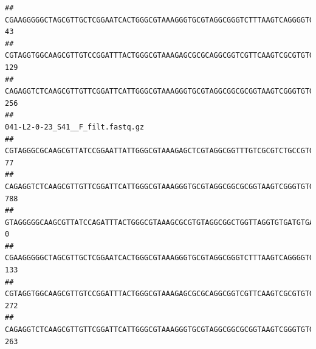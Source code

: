 \documentclass[]{article}
\begin{document}
\begin{verbatim}
## CGAAGGGGGCTAGCGTTGCTCGGAATCACTGGGCGTAAAGGGTGCGTAGGCGGGTCTTTAAGTCAGGGGTGAAATCCTGGAGCTCAACTCCAGAACTGCCTTTGATACTGAAGATCTTGAGTTCGGGAGAGGTGAGTGGAACTGCGAGTGTAGAGGTGAAATTCGTAGATATTCGCAAGAACACCAGTGGCGAAGGCGGCTCACTGGCCCGATACTGACGCTGAGGCACGAAAGCGTGGGGAGCAAACA                                  43
## CGTAGGTGGCAAGCGTTGTCCGGATTTACTGGGCGTAAAGAGCGCGCAGGCGGTCGTTCAAGTCGCGTGTGAAAGCCCCCGGCTCAACTGGGGAGGGTCACGCGATACTGATCGACTCGAAGGCAGGAGAGGGTAGTGGAATTCCCGGTGTAGTGGTGAAATGCGTAGATATCGGGAGGAACACCAGTGGCGAAGGCGACTACCTGGCCTGTTCTTGACGCTGAGGCGCGAAAGCTAGGGGAGCAAACG                                 129
## CAGAGGTCTCAAGCGTTGTTCGGATTCATTGGGCGTAAAGGGTGCGTAGGCGGCGCGGTAAGTCGGGTGTGAAATCTCGGGGCTTAACTCCGAAACTGCATTCGATACTGCCGTGCTTGAGGACTGGAGAGGAGACTGGAATTTACGGTGTAGCGGTGAAATGCGTAGATATCGTAAGGAAGACCAGTGGCGAAGGCGGGTCTCTGGACAGTTCCTGACGCTGAGGCACGAAGGCCAGGGGAGCAAACG                                 256
##                                                                                                                                                                                                                                                           041-L2-0-23_S41__F_filt.fastq.gz
## CGTAGGGCGCAAGCGTTATCCGGAATTATTGGGCGTAAAGAGCTCGTAGGCGGTTTGTCGCGTCTGCCGTGAAAGTCCGGGGCTCAACTCCGGATCTGCGGTGGGTACGGGCAGACTAGAGTGATGTAGGGGAGACTGGAATTCCTGGTGTAGCGGTGAAATGCGCAGATATCAGGAGGAACACCGATGGCGAAGGCAGGTCTCTGGGCATTAACTGACGCTGAGGAGCGAAAGCATGGGGAGCGAACA                               77
## CAGAGGTCTCAAGCGTTGTTCGGATTCATTGGGCGTAAAGGGTGCGTAGGCGGCGCGGTAAGTCGGGTGTGAAATCTCGGAGCTTAACTCCGAAACTGCATTCGATACTGCCGTGCTTGAGGACTGGAGAGGAGACTGGAATTTACGGTGTAGCGGTGAAATGCGTAGATATCGTAAGGAAGACCAGTGGCGAAGGCGGGTCTCTGGACAGTTCCTGACGCTGAGGCACGAAGGCCAGGGGAGCAAACG                              788
## GTAGGGGGCAAGCGTTATCCAGATTTACTGGGCGTAAAGCGCGTGTAGGCGGCTGGTTAGGTGTGATGTGAAATCTTCCGGCTCAACCGGAAAACTGCATTGCAAACCGGCCTGGCTAGAGTGCAGGAGAGGGAAGCGGAATTCCAGGTGTAGCGGTGAAATGCGTAGATATCTGGAGGAACACCAGTGGCGAAGGCGGCTTCCTGGCCTGCAACTGACGCTGAGACGCGAAAGCGTGGGGAGCGAAC                                 0
## CGAAGGGGGCTAGCGTTGCTCGGAATCACTGGGCGTAAAGGGTGCGTAGGCGGGTCTTTAAGTCAGGGGTGAAATCCTGGAGCTCAACTCCAGAACTGCCTTTGATACTGAAGATCTTGAGTTCGGGAGAGGTGAGTGGAACTGCGAGTGTAGAGGTGAAATTCGTAGATATTCGCAAGAACACCAGTGGCGAAGGCGGCTCACTGGCCCGATACTGACGCTGAGGCACGAAAGCGTGGGGAGCAAACA                              133
## CGTAGGTGGCAAGCGTTGTCCGGATTTACTGGGCGTAAAGAGCGCGCAGGCGGTCGTTCAAGTCGCGTGTGAAAGCCCCCGGCTCAACTGGGGAGGGTCACGCGATACTGATCGACTCGAAGGCAGGAGAGGGTAGTGGAATTCCCGGTGTAGTGGTGAAATGCGTAGATATCGGGAGGAACACCAGTGGCGAAGGCGACTACCTGGCCTGTTCTTGACGCTGAGGCGCGAAAGCTAGGGGAGCAAACG                              272
## CAGAGGTCTCAAGCGTTGTTCGGATTCATTGGGCGTAAAGGGTGCGTAGGCGGCGCGGTAAGTCGGGTGTGAAATCTCGGGGCTTAACTCCGAAACTGCATTCGATACTGCCGTGCTTGAGGACTGGAGAGGAGACTGGAATTTACGGTGTAGCGGTGAAATGCGTAGATATCGTAAGGAAGACCAGTGGCGAAGGCGGGTCTCTGGACAGTTCCTGACGCTGAGGCACGAAGGCCAGGGGAGCAAACG                              263

\end{verbatim}
\end{document}
